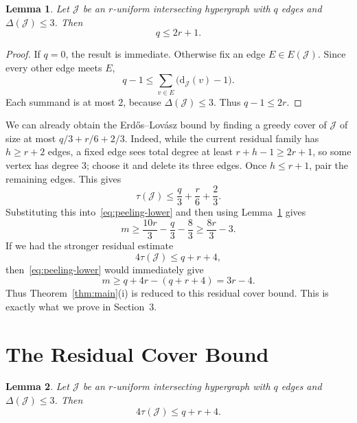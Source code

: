 \documentclass[11pt]{amsart}
\newtheorem{lemma}{Lemma}
\theoremstyle{remark}
\newcommand{\cJ}{\mathcal J}
\newcommand{\dd}{\mathrm d}
\newcommand{\ta}{\tau}
\newcommand{\Del}{\Delta}
\begin{document}
\begin{lemma}\label{lem:q-upper}
Let $\cJ$ be an $r$-uniform intersecting hypergraph with $q$ edges and
$\Del(\cJ)\le 3$.  Then
\[
  q\le 2r+1.
\]
\end{lemma}

\begin{proof}
If $q=0$, the result is immediate.  Otherwise fix an edge $E\in E(\cJ)$.
Since every other edge meets $E$,
\[
  q-1
  \le \sum_{v\in E}\bigl(\dd_{\cJ}(v)-1\bigr).
\]
Each summand is at most $2$, because $\Del(\cJ)\le 3$.  Thus $q-1\le 2r$.
\end{proof}

We can already obtain the Erd\H{o}s--Lov\'asz bound by finding a greedy cover
of $\cJ$ of size at most $q/3+r/6+2/3$.  Indeed, while the current residual
family has $h\ge r+2$ edges, a fixed edge sees total degree at least
$r+h-1\ge 2r+1$, so some vertex has degree $3$; choose it and delete its
three edges.  Once $h\le r+1$, pair the remaining edges.  This gives
\[
  \ta(\cJ)\le \frac q3+\frac r6+\frac23.
\]
Substituting this into~\eqref{eq:peeling-lower} and then using
Lemma~\ref{lem:q-upper} gives
\[
  m\ge \frac{10r}{3}-\frac q3-\frac83
    \ge \frac{8r}{3}-3.
\]
If we had the stronger residual estimate
\[
  4\ta(\cJ)\le q+r+4,
\]
then~\eqref{eq:peeling-lower} would immediately give
\[
  m\ge q+4r-(q+r+4)=3r-4.
\]
Thus Theorem~\ref{thm:main}(i) is reduced to this residual cover bound.  This
is exactly what we prove in Section~3.

\section{The Residual Cover Bound}

\begin{lemma}\label{lem:residual-cover}
Let $\cJ$ be an $r$-uniform intersecting hypergraph with $q$ edges and
$\Del(\cJ)\le 3$.  Then
\[
  4\ta(\cJ)\le q+r+4.
\]
\end{lemma}
\end{document}
